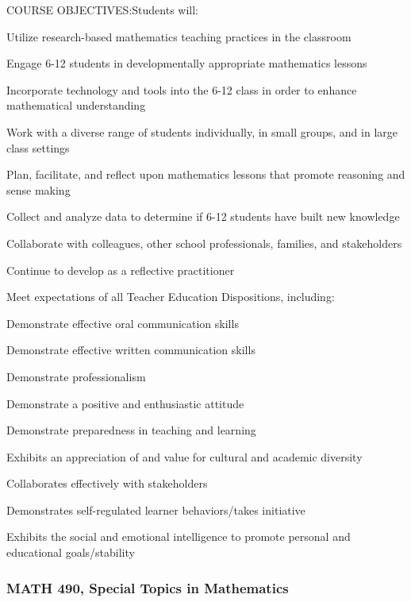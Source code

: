 COURSE OBJECTIVES:Students will:
\begin{alphalist}
\item Utilize research-based mathematics teaching practices in the classroom
\item Engage 6-12 students in developmentally appropriate mathematics lessons
\item Incorporate technology and tools into the 6-12 class in order to enhance mathematical understanding
\item Work with a diverse range of students individually, in small groups, and in large class settings
\item Plan, facilitate, and reflect upon mathematics lessons that promote reasoning and sense making
\item Collect and analyze data to determine if 6-12 students have built new knowledge 
\item Collaborate with colleagues, other school professionals, families, and stakeholders
\item Continue to develop as a reflective practitioner
\item Meet expectations of all Teacher Education Dispositions, including:
\begin{betalist}
\item Demonstrate effective oral communication skills
\item Demonstrate effective written communication skills
\item Demonstrate professionalism
\item Demonstrate a positive and enthusiastic attitude
\item Demonstrate preparedness in teaching and learning
\item Exhibits an appreciation of and value for cultural and academic diversity
\item Collaborates effectively with stakeholders
\item Demonstrates self-regulated learner behaviors/takes initiative
\item Exhibits the social and emotional intelligence to promote personal and educational goals/stability
\end{betalist}
\end{alphalist}

\subsubsection{MATH 490, Special Topics in Mathematics}

